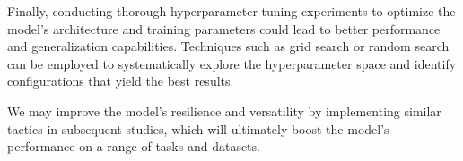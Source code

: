 \documentclass[conference]{IEEEtran}
\begin{document}
Finally, conducting thorough hyperparameter tuning experiments to optimize the model's architecture and training parameters could lead to better performance and generalization capabilities. Techniques such as grid search or random search can be employed to systematically explore the hyperparameter space and identify configurations that yield the best results.

We may improve the model's resilience and versatility by implementing similar tactics in subsequent studies, which will ultimately boost the model's performance on a range of tasks and datasets.
\end{document}
